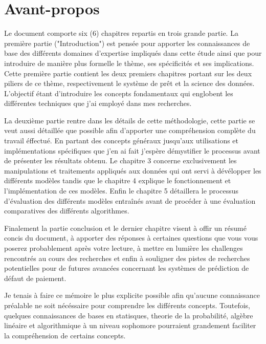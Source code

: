 \chapter*{Avant-propos}
Le document comporte six (6) chapitres repartis en trois grande partie. La première partie ("Introduction") est pensée pour apporter les connaissances de base des différents domaines d'expertise impliqués dans cette étude ainsi que pour introduire de manière plus formelle le thème, ses spécificités et ses implications. Cette première partie contient les deux premiers chapitres portant sur les deux piliers de ce thème, respectivement le système de prêt et la science des données. L'objectif étant d'introduire les concepts fondamentaux qui englobent les différentes techniques que j'ai employé dans mes recherches.

La deuxième partie rentre dans les détails de cette méthodologie, cette partie se veut aussi détaillée que possible afin d'apporter une compréhension complète du travail éffectué. En partant des concepts généraux jusqu'aux utilisations et implémentations spécifiques que j'en ai fait j'espère démystifier le processus avant de présenter les résultats obtenu. Le chapitre 3 concerne exclusivement les manipulations et traitements appliqués aux données qui ont servi à dévélopper les différents modèles tandis que le chapitre 4 explique le fonctionnement et l'implémentation de ces modèles.
Enfin le chapitre 5 détaillera le processus d'évaluation des différents modèles entraînés avant de procéder à une évaluation comparatives des différents algorithmes.

Finalement la partie conclusion et le dernier chapitre visent à offir un résumé concis du document, à apporter des réponses à certaines questions que vous vous poserez probablement après votre lecture, à mettre en lumière les challenges rencontrés au cours des recherches et enfin à souligner des pistes de recherches potentielles pour de futures avancées concernant les systèmes de prédiction de défaut de paiement.

Je tenais à faire ce mémoire le plus explicite possible afin qu'aucune connaissance préalable ne soit nécéssaire pour comprendre les différents concepts. Toutefois, quelques connaissances de bases en statisques, theorie de la probabilité, algèbre linéaire et algorithmique à un niveau sophomore pourraient grandement faciliter la compréhension de certains concepts.

\clearpage